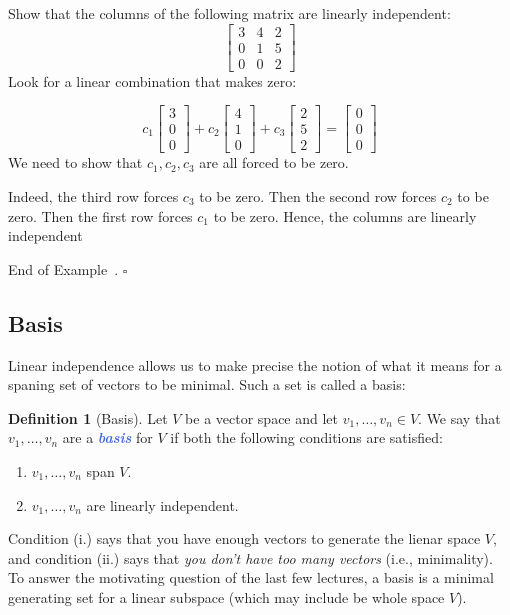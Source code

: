 \documentclass[10pt]{article}
\newcommand{\demph}[1]{\textcolor{RoyalBlue}{\textbf{\slshape #1}}} %
\theoremstyle{definition}
\newtheorem{definition}[theorem]{Definition}
\newtheorem{example}[theorem]{Example}
\renewenvironment{example}
{\begin{oldexample}}
  {\par\smallskip\hfill   End of Example~\theexample. $\square$    \par\end{oldexample}}
\begin{document}
\begin{example}
  Show that the columns of the following matrix are linearly independent:
  \begin{equation*}
    \begin{bmatrix}
      3&4&2\\0&1&5\\0&0&2
    \end{bmatrix}
  \end{equation*}
  Look for a linear combination that makes zero:
  
  \begin{equation*}
    c_{1}
    \begin{bmatrix}
      3\\0\\0
    \end{bmatrix}
    +
    c_{2}
    \begin{bmatrix}
      4\\1\\0
    \end{bmatrix}
    +
    c_{3}
    \begin{bmatrix}
      2\\5\\2
    \end{bmatrix}
    =
    \begin{bmatrix}
      0\\0\\0
    \end{bmatrix}
  \end{equation*}
  We need to show that $c_{1},c_{2},c_{3}$ are all forced to be zero.

  Indeed, the third row forces $c_{3}$ to be zero. Then the second row forces
  $c_{2}$ to be zero. Then the first row forces $c_{1}$ to be zero. Hence, the
  columns are linearly independent
\end{example}




\subsection{Basis}
Linear independence allows us to make precise the notion of what it means for
a spaning set of vectors to be minimal. Such a set is called a basis:

\begin{definition}[Basis]
  \label{def:basis}
  Let $V$ be a vector space and let $v_{1},\ldots,v_{n}\in V$. We say that
  $v_{1},\ldots,v_{n}$ are a \demph{basis} for $V$ if both the following
  conditions are satisfied:
  \begin{enumerate}[label=(\roman*.)]
    \item $v_{1},\ldots,v_{n}$ span $V$. 
    \item $v_{1},\ldots,v_{n}$ are linearly independent. 
  \end{enumerate}
\end{definition}
Condition (i.) says that you have enough vectors to generate the lienar space
$V$, and condition (ii.) says that \textit{you don't have too many vectors}
(i.e., minimality). To answer the motivating question of the last few
lectures, a basis is a minimal generating set for a linear subspace (which may
include be whole space $V$).
\end{document}
